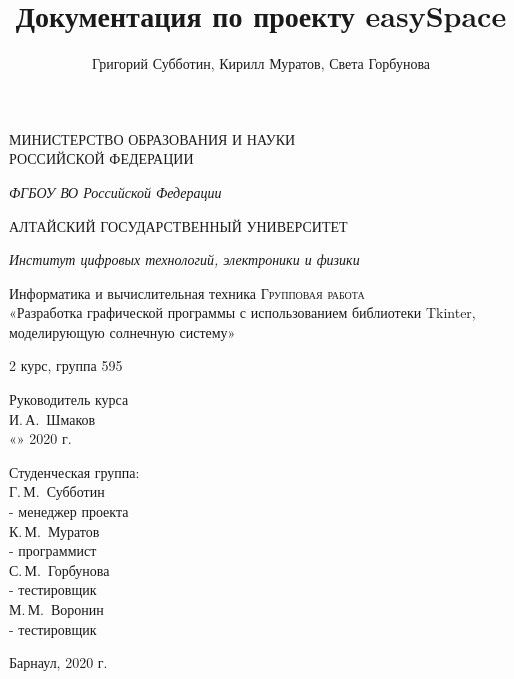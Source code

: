 \documentclass[11pt,a4paper]{report}
\author{Григорий Субботин, Кирилл Муратов, Света Горбунова}
\title{Документация по проекту easySpace}
\begin{document}
\begin{titlepage}
 \begin{center}
    \large
    МИНИСТЕРСТВО ОБРАЗОВАНИЯ И НАУКИ\\ РОССИЙСКОЙ ФЕДЕРАЦИИ
     
    \textit{ФГБОУ ВО Российской Федерации}
    \vspace{0.5cm}
 
    АЛТАЙСКИЙ ГОСУДАРСТВЕННЫЙ УНИВЕРСИТЕТ
    
    \vspace{0.25cm}
     
    \textit{Институт цифровых технологий, электроники и физики}
    
    \vfill 
    Информатика и вычислительная техника
    \vfill
    \textsc{Групповая работа}\\[5mm]
     
    {\LARGE «Разработка графической программы с использованием библиотеки Tkinter, моделирующую солнечную систему»}
  \bigskip
     
     2 курс, группа 595
\end{center}
\vfill
 
\newlength{\ML}
\hfill\begin{minipage}{0.5\textwidth}
  Руководитель курса\\
  \underline{\hspace{\ML}} И.\,А.~Шмаков\\
  «\underline{\hspace{0.5cm}}» \underline{\hspace{1cm}} 2020 г.
\end{minipage}%
\bigskip
 
\hfill\begin{minipage}{0.5\textwidth}
  Студенческая группа:\\
  \underline{\hspace{\ML}} Г.\,М.~Субботин  \\- менеджер проекта\\
  \underline{\hspace{\ML}} К.\,М.~Муратов \\- программист\\
  \underline{\hspace{\ML}} С.\,М.~Горбунова  \\- тестировщик\\
   \underline{\hspace{\ML}} М.\,М.~Воронин  \\- тестировщик\\
\end{minipage}%
\vfill
 
\begin{center}
  Барнаул, 2020 г.
\end{center}
\end{titlepage}
\end{document}
